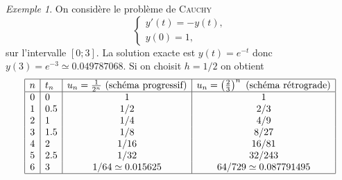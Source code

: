 \documentclass[a4paper,11pt]{article}
\theoremstyle{plain}
\theoremstyle{definition}
\theoremstyle{remark}
\newtheorem*{exe}{Exemple}
\begin{document}
\begin{exe}
On considère le problème de \textsc{Cauchy}
\[
\begin{cases}
y'(t)=-y(t),\\
y(0)=1,
\end{cases}
\]
sur l'intervalle $[0;3]$. La solution exacte est $y(t)=e^{-t}$ donc $y(3)=e^{-3}\simeq0.049787068$. Si on choisit $h=1/2$ on obtient 
\[
\begin{array}{|c|l|c|c|}
\hline
n&t_n&u_n=\frac{1}{2^n} \text{ (schéma progressif)}&u_n=\left(\frac{2}{3}\right)^n \text{ (schéma rétrograde)}\\
\hline
0&0&1&1\\
1&0.5&1/2&2/3\\
2&1&1/4&4/9\\
3&1.5&1/8&8/27\\
4&2&1/16&16/81\\
5&2.5&1/32&32/243\\
6&3&1/64\simeq0.015625&64/729\simeq0.087791495\\
\hline
\end{array}
\]
\end{exe}
\end{document}
